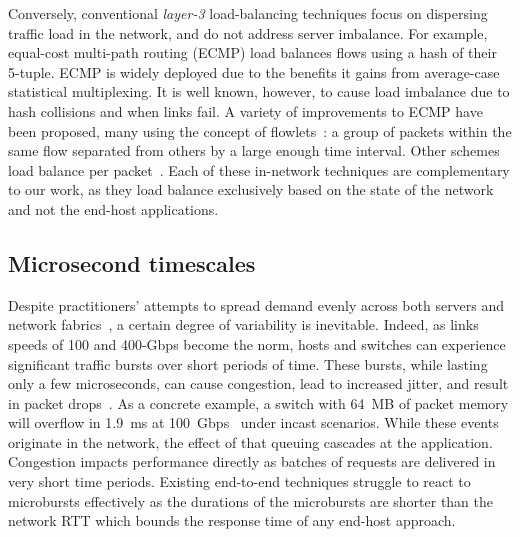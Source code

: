 Conversely, conventional \textit{layer-3} load-balancing techniques focus on
dispersing traffic load in the network, and do not address server
imbalance.  For example, equal-cost multi-path routing (ECMP) load
balances flows using a hash of their 5-tuple. ECMP is widely deployed
due to the benefits it gains from average-case statistical
multiplexing.  It is well known, however, to cause load imbalance due
to hash collisions and when links fail.  A variety of improvements to
ECMP have been proposed, many using the concept of
flowlets~\cite{conga, clove, HULA, letitflow}: a group of packets
within the same flow separated from others by a large enough time
interval. Other schemes load balance per
packet~\cite{drill,flowbender,hermes}. Each of these in-network
techniques are complementary to our work, as they load balance
exclusively based on the state of the network and not the end-host
applications.

\subsection{Microsecond timescales}

Despite practitioners' attempts to spread demand evenly across both
servers and network fabrics~\cite{facebook:sigcomm15}, a certain
degree of variability is inevitable.  Indeed, as links speeds of 100 and
400-Gbps become the norm, hosts and switches can experience
significant traffic bursts over short periods of time. These bursts,
while lasting only a few microseconds, can cause congestion, lead to
increased jitter, and result in packet
drops~\cite{facebook_microburst}. As a concrete example, a switch with
64~MB of packet memory will overflow in 1.9~ms at
100~Gbps~\cite{tofino2} under incast scenarios.  While these events
originate in the network, the effect of that queuing cascades at the
application. Congestion impacts performance directly as batches of
requests are delivered in very short time periods.  Existing
end-to-end techniques struggle to react to microbursts effectively as
the durations of the microbursts are shorter than the network RTT
which bounds the response time of any end-host approach.


